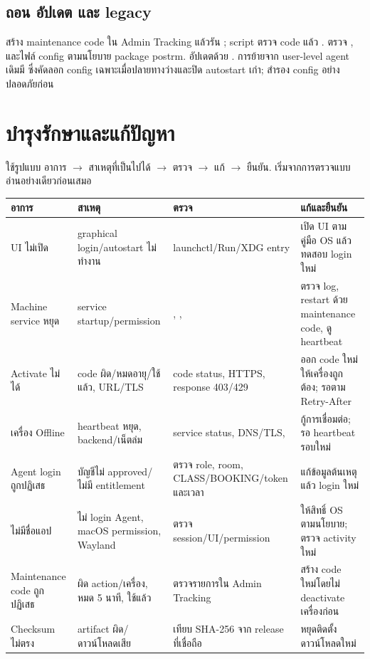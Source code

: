 \section*{ถอน อัปเดต และ legacy}
สร้าง  maintenance code ใน Admin Tracking แล้วรัน ; script ตรวจ code แล้ว . ตรวจ ,  และไฟล์ config ตามนโยบาย package postrm. อัปเดตด้วย . การย้ายจาก user-level agent เดิมมี  ซึ่งคัดลอก config เฉพาะเมื่อปลายทางว่างและปิด autostart เก่า; สำรอง config อย่างปลอดภัยก่อน

\chapter{บำรุงรักษาและแก้ปัญหา}
ใช้รูปแบบ อาการ $\rightarrow$ สาเหตุที่เป็นไปได้ $\rightarrow$ ตรวจ $\rightarrow$ แก้ $\rightarrow$ ยืนยัน. เริ่มจากการตรวจแบบอ่านอย่างเดียวก่อนเสมอ
\begin{longtable}{L{31mm}L{40mm}L{42mm}L{43mm}}
\toprule อาการ & สาเหตุ & ตรวจ & แก้และยืนยัน \\ \midrule\endhead
UI ไม่เปิด & graphical login/autostart ไม่ทำงาน & launchctl/Run/XDG entry & เปิด UI ตามคู่มือ OS แล้วทดสอบ login ใหม่ \\
Machine service หยุด & service startup/permission & , ,  & ตรวจ log, restart ด้วย maintenance code, ดู heartbeat \\
Activate ไม่ได้ & code ผิด/หมดอายุ/ใช้แล้ว, URL/TLS & code status, HTTPS, response 403/429 & ออก code ใหม่ให้เครื่องถูกต้อง; รอตาม Retry-After \\
เครื่อง Offline & heartbeat หยุด, backend/เน็ตล่ม & service status, DNS/TLS,  & กู้การเชื่อมต่อ; รอ heartbeat รอบใหม่ \\
Agent login ถูกปฏิเสธ & บัญชีไม่ approved/ไม่มี entitlement & ตรวจ role, room, CLASS/BOOKING/token และเวลา & แก้ข้อมูลต้นเหตุแล้ว login ใหม่ \\
ไม่มีชื่อแอป & ไม่ login Agent, macOS permission, Wayland & ตรวจ session/UI/permission & ให้สิทธิ์ OS ตามนโยบาย; ตรวจ activity ใหม่ \\
Maintenance code ถูกปฏิเสธ & ผิด action/เครื่อง, หมด 5 นาที, ใช้แล้ว & ตรวจรายการใน Admin Tracking & สร้าง code ใหม่โดยไม่ deactivate เครื่องก่อน \\
Checksum ไม่ตรง & artifact ผิด/ดาวน์โหลดเสีย & เทียบ SHA-256 จาก release ที่เชื่อถือ & หยุดติดตั้ง ดาวน์โหลดใหม่ \\
\bottomrule
\end{longtable}
